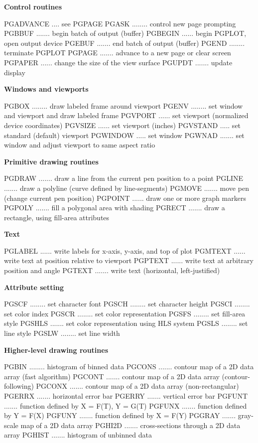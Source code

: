 \par\centerline{\bf Control routines}
{\eightpoint\begintt
PGADVANCE .... see PGPAGE
PGASK ........ control new page prompting
PGBBUF ....... begin batch of output (buffer)
PGBEGIN ...... begin PGPLOT, open output device
PGEBUF ....... end batch of output (buffer)
\endtt}
{\eightpoint\begintt
PGEND ........ terminate PGPLOT
PGPAGE ....... advance to a new page or clear screen
PGPAPER ...... change the size of the view surface
PGUPDT ....... update display
\endtt}

\par\centerline{\bf Windows and viewports}
{\eightpoint\begintt
PGBOX ........ draw labeled frame around viewport
PGENV ........ set window and viewport and draw labeled frame
PGVPORT ...... set viewport (normalized device coordinates)
PGVSIZE ...... set viewport (inches)
PGVSTAND ..... set standard (default) viewport
\endtt}
{\eightpoint\begintt
PGWINDOW ..... set window
PGWNAD ....... set window and adjust viewport to same aspect ratio
\endtt}

\par\centerline{\bf Primitive drawing routines}
{\eightpoint\begintt
PGDRAW ....... draw a line from the current pen position to a point
PGLINE ....... draw a polyline (curve defined by line-segments)
PGMOVE ....... move pen (change current pen position)
PGPOINT ...... draw one or more graph markers
PGPOLY ....... fill a polygonal area with shading
\endtt}
{\eightpoint\begintt
PGRECT ....... draw a rectangle, using fill-area attributes
\endtt}

\par\centerline{\bf Text}
{\eightpoint\begintt
PGLABEL ...... write labels for x-axis, y-axis, and top of plot
PGMTEXT ...... write text at position relative to viewport
PGPTEXT ...... write text at arbitrary position and angle
PGTEXT ....... write text (horizontal, left-justified)
\endtt}

\par\centerline{\bf Attribute setting}
{\eightpoint\begintt
PGSCF ........ set character font
PGSCH ........ set character height
PGSCI ........ set color index
PGSCR ........ set color representation
PGSFS ........ set fill-area style
\endtt}
{\eightpoint\begintt
PGSHLS ....... set color representation using HLS system
PGSLS ........ set line style
PGSLW ........ set line width
\endtt}

\par\centerline{\bf Higher-level drawing routines}
{\eightpoint\begintt
PGBIN ........ histogram of binned data
PGCONS ....... contour map of a 2D data array (fast algorithm)
PGCONT ....... contour map of a 2D data array (contour-following)
PGCONX ....... contour map of a 2D data array (non-rectangular)
PGERRX ....... horizontal error bar
\endtt}
{\eightpoint\begintt
PGERRY ....... vertical error bar
PGFUNT ....... function defined by X = F(T), Y = G(T)
PGFUNX ....... function defined by Y = F(X)
PGFUNY ....... function defined by X = F(Y)
PGGRAY ....... gray-scale map of a 2D data array
\endtt}
{\eightpoint\begintt
PGHI2D ....... cross-sections through a 2D data array
PGHIST ....... histogram of unbinned data
\endtt}

